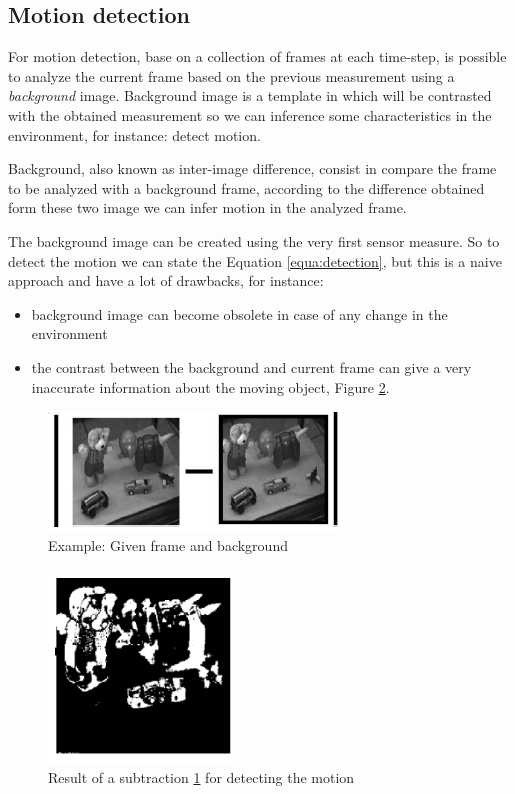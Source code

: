 \documentclass{article}
\begin{document}
\subsection{Motion detection}

For motion detection, base on a collection of frames at each time-step, is possible to analyze the current frame based on the previous measurement using a \emph{background} image. Background image is a template in which will be contrasted with the obtained measurement so we can inference some characteristics in the environment, for instance: detect motion.

Background, also known as inter-image difference, consist in compare the frame to be analyzed with a background frame, according to the difference obtained form these two image we can infer motion in the analyzed frame. 

The background image can be created using the very first sensor measure. So to detect the motion we can state the Equation \ref{equa:detection}, but this is a naive approach and have a lot of drawbacks, for instance:
\begin{itemize}
\item background image can become obsolete in case of any change in the environment
\item the contrast between the background and current frame can give a very inaccurate information about the moving object, Figure \ref{fig:subtraction_result}.
\end{itemize}

\begin{figure}[H]
\includegraphics[scale=0.6]{image/subtraction.png}
\caption{Example: Given frame and background}
\label{fig:subtraction}
\end{figure}

\begin{figure}[H]
\includegraphics[scale=0.6]{image/subtraction_result.png}
\caption{Result of a subtraction \ref{fig:subtraction} for detecting the motion}
\label{fig:subtraction_result}
\end{figure}
\end{document}
